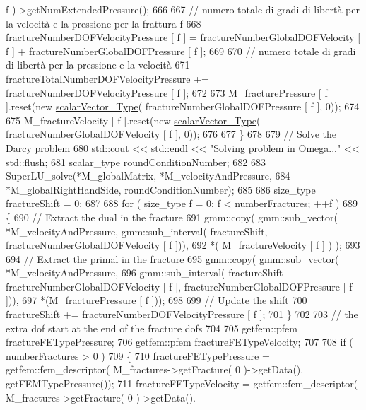 \begin{DoxyCode}
       f )->getNumExtendedPressure();
666 
667         \textcolor{comment}{// numero totale di gradi di libertà per la velocità e la pressione per la frattura f}
668         fractureNumberDOFVelocityPressure [ f ] = fractureNumberGlobalDOFVelocity [ f ] + 
      fractureNumberGlobalDOFPressure [ f ];
669 
670         \textcolor{comment}{// numero totale di gradi di libertà per la pressione e la velocità}
671         fractureTotalNumberDOFVelocityPressure += fractureNumberDOFVelocityPressure [ f ];
672 
673         M\_fracturePressure [ f ].reset(\textcolor{keyword}{new} \hyperlink{Core_8h_a4e75b5863535ba1dd79942de2846eff0}{scalarVector\_Type}( 
      fractureNumberGlobalDOFPressure [ f ], 0));
674 
675         M\_fractureVelocity [ f ].reset(\textcolor{keyword}{new} \hyperlink{Core_8h_a4e75b5863535ba1dd79942de2846eff0}{scalarVector\_Type}( 
      fractureNumberGlobalDOFVelocity [ f ], 0));
676 
677     \}
678     
679     \textcolor{comment}{// Solve the Darcy problem}
680     std::cout << std::endl << \textcolor{stringliteral}{"Solving problem in Omega..."} << std::flush;
681     scalar\_type roundConditionNumber;
682 
683     SuperLU\_solve(*M\_globalMatrix, *M\_velocityAndPressure,
684                   *M\_globalRightHandSide, roundConditionNumber);
685   
686     size\_type fractureShift = 0;
687     
688     \textcolor{keywordflow}{for} ( size\_type f = 0; f < numberFractures; ++f )
689     \{ 
690         \textcolor{comment}{// Extract the dual in the fracture}
691         gmm::copy( gmm::sub\_vector( *M\_velocityAndPressure, gmm::sub\_interval( fractureShift, 
      fractureNumberGlobalDOFVelocity [ f ])),
692                   *( M\_fractureVelocity [ f ] ) );
693 
694         \textcolor{comment}{// Extract the primal in the fracture}
695         gmm::copy( gmm::sub\_vector( *M\_velocityAndPressure, 
696                                     gmm::sub\_interval( fractureShift + fractureNumberGlobalDOFVelocity [ f 
      ], fractureNumberGlobalDOFPressure [ f ])), 
697                    *(M\_fracturePressure [ f ]));
698 
699         \textcolor{comment}{// Update the shift}
700         fractureShift += fractureNumberDOFVelocityPressure [ f ];
701     \}
702 
703     \textcolor{comment}{// the extra dof start at the end of the fracture dofs}
704   
705     getfem::pfem fractureFETypePressure;
706     getfem::pfem fractureFETypeVelocity;
707     
708     \textcolor{keywordflow}{if} ( numberFractures > 0 )
709     \{
710         fractureFETypePressure = getfem::fem\_descriptor( M\_fractures->getFracture( 0 )->getData().
      getFEMTypePressure());
711         fractureFETypeVelocity = getfem::fem\_descriptor( M\_fractures->getFracture( 0 )->getData().

\end{DoxyCode}
